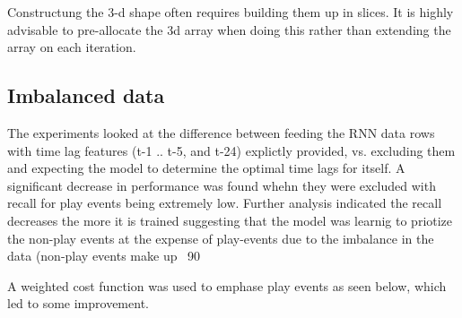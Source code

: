 Constructung the 3-d shape often requires building them up in slices. It is highly advisable to pre-allocate the 3d array when doing this rather than extending the array on each iteration.

\subsection{Imbalanced data}

The experiments looked at the difference between feeding the RNN data rows with time lag features (t-1 .. t-5, and t-24) explictly provided, vs. excluding them and expecting the model to determine the optimal time lags for itself. A significant decrease in performance was found whehn they were excluded with recall for play events being extremely low. Further analysis indicated the recall decreases the more it is trained suggesting that the model was learnig to priotize the non-play events at the expense of play-events due to the imbalance in the data (non-play events make up ~90%

A weighted cost function was used to emphase play events as seen below, which led to some improvement.

